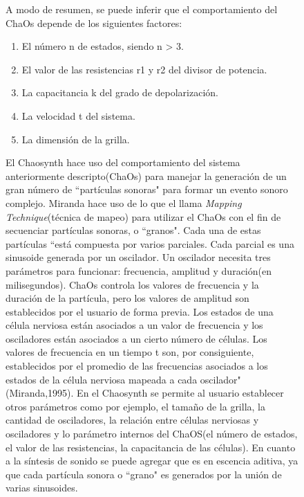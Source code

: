\documentclass[16pt,spanish]{article}
\begin{document}
\begin{figure}[h!]
A modo de resumen, se puede inferir que el comportamiento del ChaOs depende de los siguientes factores:

\begin{enumerate}
	\item El número n de estados, siendo n > 3.
	\item El valor de las resistencias r1 y r2 del divisor de potencia.
	\item La capacitancia k del grado de depolarización.
	\item La velocidad t del sistema.
	\item La dimensión de la grilla.
\end{enumerate}


El Chaosynth hace uso del comportamiento del sistema anteriormente descripto(ChaOs) para manejar la generación de un gran número de ``partículas sonoras" para formar un evento sonoro complejo. Miranda hace uso de lo que el llama \textit{Mapping Technique}(técnica de mapeo) para utilizar el ChaOs con el fin de secuenciar partículas sonoras, o ``granos". Cada una de estas partículas  ``está compuesta por varios parciales. Cada parcial es una sinusoide generada por un oscilador. Un oscilador necesita tres parámetros para funcionar: frecuencia, amplitud y duración(en milisegundos). ChaOs controla los valores de frecuencia y la duración de la partícula, pero los valores de amplitud son establecidos por el usuario de forma previa. Los estados de una célula nerviosa están asociados a un valor de frecuencia y los osciladores están asociados a un cierto número de células. Los valores de frecuencia en un tiempo t son, por consiguiente, establecidos por el promedio de las frecuencias asociados a los estados de la célula nerviosa mapeada a cada oscilador"(Miranda,1995). En el Chaosynth se permite al usuario establecer otros parámetros como por ejemplo, el tamaño de la grilla, la cantidad de osciladores, la relación entre células nerviosas y osciladores y lo parámetro internos del ChaOS(el número de estados, el valor de las resistencias, la capacitancia de las células). En cuanto a la síntesis de sonido se puede agregar que es en escencia aditiva, ya que cada partícula sonora o ``grano" es generados por la unión de varias sinusoides.



\end{figure}
\end{document}
